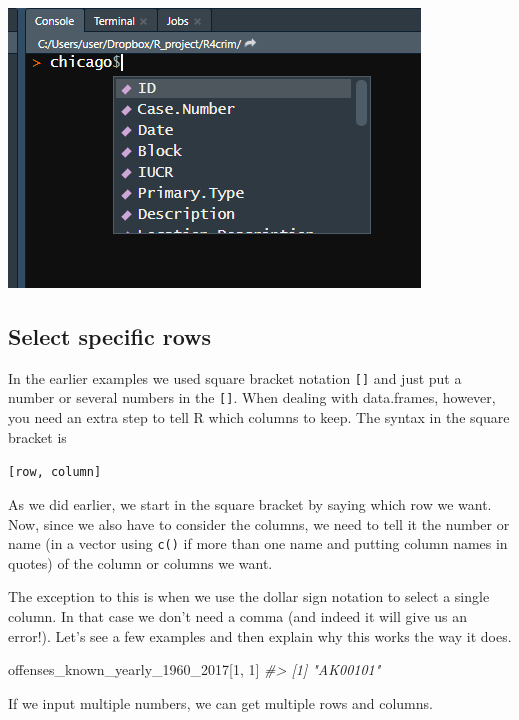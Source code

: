 \documentclass[
  12pt,
]{book}
\newenvironment{Shaded}{\begin{snugshade}}{\end{snugshade}}
\newcommand{\CommentTok}[1]{\textcolor[rgb]{0.37,0.37,0.37}{\textit{#1}}}
\newcommand{\DecValTok}[1]{\textcolor[rgb]{0.06,0.06,0.06}{#1}}
\newcommand{\NormalTok}[1]{#1}
\begin{document}
\includegraphics{images/tab_example.png}

\hypertarget{select-specific-rows}{%
\subsection{Select specific rows}\label{select-specific-rows}}

In the earlier examples we used square bracket notation \texttt{{[}{]}} and just put a number or several numbers in the \texttt{{[}{]}}. When dealing with data.frames, however, you need an extra step to tell R which columns to keep. The syntax in the square bracket is

\texttt{{[}row,\ column{]}}

As we did earlier, we start in the square bracket by saying which row we want. Now, since we also have to consider the columns, we need to tell it the number or name (in a vector using \texttt{c()} if more than one name and putting column names in quotes) of the column or columns we want.

The exception to this is when we use the dollar sign notation to select a single column. In that case we don't need a comma (and indeed it will give us an error!). Let's see a few examples and then explain why this works the way it does.

\begin{Shaded}
\begin{Highlighting}[]
\NormalTok{offenses\_known\_yearly\_1960\_2017[}\DecValTok{1}\NormalTok{, }\DecValTok{1}\NormalTok{]}
\CommentTok{\#\textgreater{} [1] "AK00101"}
\end{Highlighting}
\end{Shaded}

If we input multiple numbers, we can get multiple rows and columns.
\end{document}
